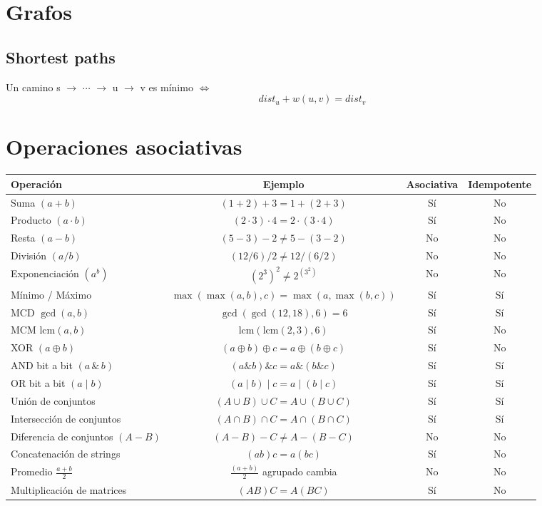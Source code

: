\documentclass[12pt]{article}
\begin{document}
    \section{Grafos}
        \subsection{Shortest paths}
            Un camino s \(\rightarrow\) \(\cdots\) \(\rightarrow\) u \(\rightarrow\) v es mínimo \(\iff\) 
        \[dist_u + w(u,v) = dist_v\]
    \section{Operaciones asociativas}
    \begin{table}[H]
        \centering
        \small
        \renewcommand{\arraystretch}{1.3}
        \begin{tabular}{|l|c|c|c|}
        \hline
        \textbf{Operación} & \textbf{Ejemplo} & \textbf{Asociativa} & \textbf{Idempotente} \\
        \hline
        Suma $(a+b)$ & $(1+2)+3 = 1+(2+3)$ & Sí & No \\
        Producto $(a \cdot b)$ & $(2\cdot 3)\cdot 4 = 2\cdot(3\cdot 4)$ & Sí & No \\
        Resta $(a-b)$ & $(5-3)-2 \neq 5-(3-2)$ & No & No \\
        División $(a/b)$ & $(12/6)/2 \neq 12/(6/2)$ & No & No \\
        Exponenciación $(a^b)$ & $(2^3)^2 \neq 2^{(3^2)}$ & No & No \\
        Mínimo / Máximo & $\max(\max(a,b),c) = \max(a,\max(b,c))$ & Sí & Sí \\
        MCD $\gcd(a,b)$ & $\gcd(\gcd(12,18),6)=6$ & Sí & Sí \\
        MCM $\mathrm{lcm}(a,b)$ & $\mathrm{lcm}(\mathrm{lcm}(2,3),6)$ & Sí & No \\
        XOR $(a \oplus b)$ & $(a\oplus b)\oplus c = a\oplus(b\oplus c)$ & Sí & No \\
        AND bit a bit $(a \,\&\, b)$ & $(a\&b)\&c = a\&(b\&c)$ & Sí & Sí \\
        OR bit a bit $(a \mid b)$ & $(a\mid b)\mid c = a\mid(b\mid c)$ & Sí & Sí \\
        Unión de conjuntos & $(A\cup B)\cup C = A\cup(B\cup C)$ & Sí & Sí \\
        Intersección de conjuntos & $(A\cap B)\cap C = A\cap(B\cap C)$ & Sí & Sí \\
        Diferencia de conjuntos $(A-B)$ & $(A-B)-C \neq A-(B-C)$ & No & No \\
        Concatenación de strings & $(ab)c = a(bc)$ & Sí & No \\
        Promedio $\frac{a+b}{2}$ & $\frac{(a+b)}{2}$ agrupado cambia & No & No \\
        Multiplicación de matrices & $(AB)C = A(BC)$ & Sí & No \\
        \hline
        \end{tabular}
        \end{table}
\end{document}
